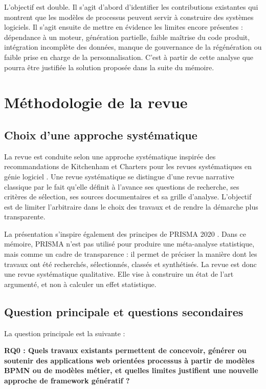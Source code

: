 \documentclass[12pt,a4paper]{article}
\begin{document}
L'objectif est double. Il s'agit d'abord d'identifier les contributions existantes qui montrent que les modèles de processus peuvent servir à construire des systèmes logiciels. Il s'agit ensuite de mettre en évidence les limites encore présentes : dépendance à un moteur, génération partielle, faible maîtrise du code produit, intégration incomplète des données, manque de gouvernance de la régénération ou faible prise en charge de la personnalisation. C'est à partir de cette analyse que pourra être justifiée la solution proposée dans la suite du mémoire.

\section{Méthodologie de la revue}

\subsection{Choix d'une approche systématique}

La revue est conduite selon une approche systématique inspirée des recommandations de Kitchenham et Charters pour les revues systématiques en génie logiciel \cite{kitchenham2007}. Une revue systématique se distingue d'une revue narrative classique par le fait qu'elle définit à l'avance ses questions de recherche, ses critères de sélection, ses sources documentaires et sa grille d'analyse. L'objectif est de limiter l'arbitraire dans le choix des travaux et de rendre la démarche plus transparente.

La présentation s'inspire également des principes de PRISMA 2020 \cite{prisma2020}. Dans ce mémoire, PRISMA n'est pas utilisé pour produire une méta-analyse statistique, mais comme un cadre de transparence : il permet de préciser la manière dont les travaux ont été recherchés, sélectionnés, classés et synthétisés. La revue est donc une revue systématique qualitative. Elle vise à construire un état de l'art argumenté, et non à calculer un effet statistique.

\subsection{Question principale et questions secondaires}

La question principale est la suivante :

\textbf{RQ0 : Quels travaux existants permettent de concevoir, générer ou soutenir des applications web orientées processus à partir de modèles BPMN ou de modèles métier, et quelles limites justifient une nouvelle approche de framework génératif ?}
\end{document}
